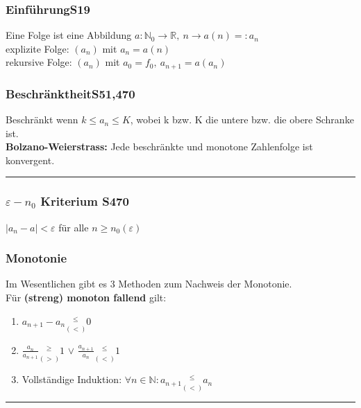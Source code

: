 \subsubsection{Einführung\color{red}S19}
Eine Folge ist eine Abbildung $a: \mathbb N_0 \rightarrow \mathbb R,\ n \rightarrow a(n) =: a_n$\\
explizite Folge: $(a_n)$ mit $a_n=a(n)$\\ 
rekursive Folge: $(a_n)$ mit $a_0=f_0,\  a_{n+1}=a(a_n)$\\

\begin{multicols}{2}
\subsubsection{Beschränktheit\color{red}S51,470}
Beschränkt wenn $k\leq a_{n}\leq K$, wobei k bzw. K die untere bzw. die obere Schranke ist.\\
\textbf{Bolzano-Weierstrass:} Jede beschränkte und monotone Zahlenfolge ist konvergent.
\hrule
\subsubsection{$\varepsilon -n_{0}$ Kriterium \color{red}S470}
$|a_{n}-a|<\varepsilon$ für alle $n\geq n_{0}(\varepsilon)$\\
\subsubsection{Monotonie}
Im Wesentlichen gibt es 3 Methoden zum Nachweis der Monotonie.\\
Für \textbf{(streng) monoton fallend} gilt:
\begin{enumerate}\itemsep0pt
\item $a_{n+1} - a_n \underset{(<)}{^{\le}} 0$
\item $\frac{a_n}{a_{n+1}} \underset{(>)}{^{\ge}} 1$ \qquad $\lor$ \qquad $\frac{a_{n+1}}{a_n} \underset{(<)}{^{\le}} 1$
\item Vollständige Induktion: $\forall n \in \mathbb{N}: a_{n+1}\underset{(<)}{^{\le}} a_n$
\end{enumerate}
\end{multicols}
\hrule
